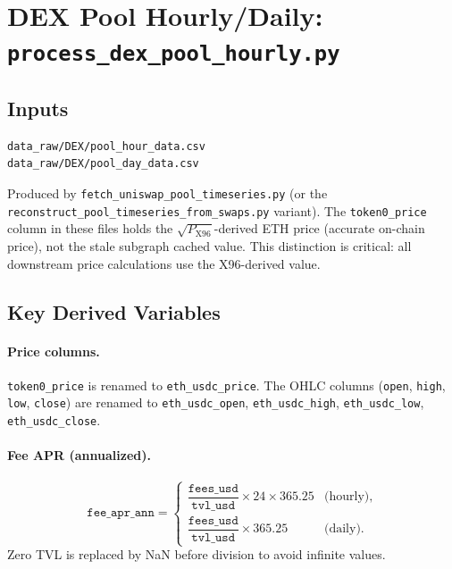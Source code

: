 \documentclass[11pt,a4paper]{article}
\begin{document}
\section{DEX Pool Hourly/Daily: \texttt{process\_dex\_pool\_hourly.py}}
\label{sec:dexpool}

\subsection{Inputs}

\begin{lstlisting}
data_raw/DEX/pool_hour_data.csv
data_raw/DEX/pool_day_data.csv
\end{lstlisting}

Produced by \texttt{fetch\_uniswap\_pool\_timeseries.py} (or the
\texttt{reconstruct\_pool\_timeseries\_from\_swaps.py} variant). The
\texttt{token0\_price} column in these files holds the
$\sqrt{P_{\mathrm{X96}}}$-derived ETH price (accurate on-chain price),
not the stale subgraph cached value. This distinction is critical: all
downstream price calculations use the X96-derived value.

\subsection{Key Derived Variables}

\paragraph{Price columns.}
\texttt{token0\_price} is renamed to \texttt{eth\_usdc\_price}.
The OHLC columns (\texttt{open}, \texttt{high}, \texttt{low},
\texttt{close}) are renamed to \texttt{eth\_usdc\_open},
\texttt{eth\_usdc\_high}, \texttt{eth\_usdc\_low},
\texttt{eth\_usdc\_close}.

\paragraph{Fee APR (annualized).}
\[
  \texttt{fee\_apr\_ann} =
  \begin{cases}
    \dfrac{\texttt{fees\_usd}}{\texttt{tvl\_usd}} \times 24 \times 365.25
    & \text{(hourly)}, \\[6pt]
    \dfrac{\texttt{fees\_usd}}{\texttt{tvl\_usd}} \times 365.25
    & \text{(daily)}.
  \end{cases}
\]
Zero TVL is replaced by NaN before division to avoid infinite values.
\end{document}
